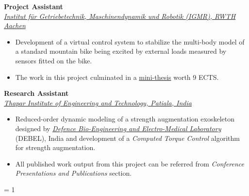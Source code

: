 \vspace{0.1 in}

\large{\textbf{Project Assistant}}
\hfill
\minithesisdate\\
\href{https://www.igmr.rwth-aachen.de/cms/~jkhpl/igmr/}{\large{\emph{Institut für Getriebetechnik, Maschinendynamik und Robotik (IGMR), RWTH Aachen}}}
\begin{itemize}
\item \large{Development of a virtual control system to stabilize the multi-body model of a standard mountain bike being excited by external loads measured by sensors fitted on the bike. }
\item\large{The work in this project culminated in a \href{https://github.com/average-engineer/MiniThesis_IGMR/blob/master/Thesis.pdf}{\large{mini-thesis}} worth 9 ECTS.}
\end{itemize}

\vspace{0.1 in}

\large{\textbf{Research Assistant}}
\hfill
\drdodate\\
\href{https://www.thapar.edu/}{\large{\emph{Thapar Institute of Engineering and Technology, Patiala, India}}}
\begin{itemize}
\item\large{Reduced-order dynamic modeling of a strength augmentation exoskeleton designed by \href{https://www.drdo.gov.in/drdo/labs-and-establishments/defence-bio-engineering-electro-medical-laboratory-debel}{\large{\emph{Defence Bio-Engineering and Electro-Medical Laboratory}}} (DEBEL), India and development of a \emph{Computed Torque Control} algorithm for strength augmentation.}
\item\large{All published work output from this project can be referred from \emph{Conference Presentations and Publications} section.}
\end{itemize}

\ifnum\teach = 1
	\vspace{0.1 in}
	
